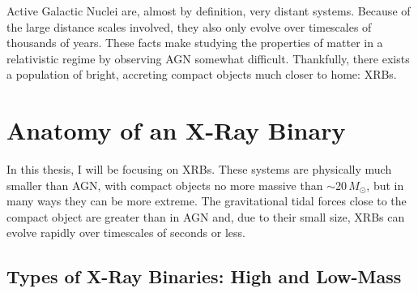 \par Active Galactic Nuclei are, almost by definition, very distant systems.  Because of the large distance scales involved, they also only evolve over timescales of thousands of years.  These facts make studying the properties of matter in a relativistic regime by observing AGN somewhat difficult.  Thankfully, there exists a population of bright, accreting compact objects much closer to home: XRBs.

\section{Anatomy of an X-Ray Binary}

\par In this thesis, I will be focusing on XRBs.  These systems are physically much smaller than AGN, with compact objects no more massive than $\sim20\,M_\odot$, but in many ways they can be more extreme.  The gravitational tidal forces close to the compact object are greater than in AGN and, due to their small size, XRBs can evolve rapidly over timescales of seconds or less.

\subsection{Types of X-Ray Binaries: High and Low-Mass}

